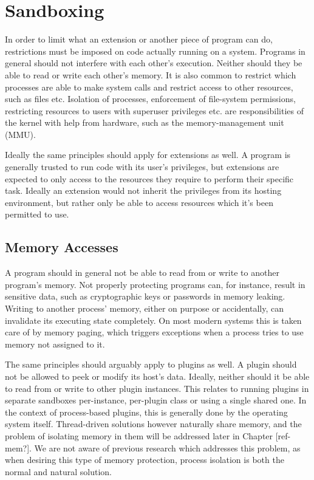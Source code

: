 \chapter {Sandboxing}

In order to limit what an extension or another piece of program can do,
restrictions must be imposed on code actually running on a system. Programs in
general should not interfere with each other's execution. Neither should they be
able to read or write each other's memory. It is also common to restrict which
processes are able to make system calls and restrict access to other resources,
such as files etc. Isolation of processes, enforcement of file-system
permissions, restricting resources to users with superuser privileges etc. are
responsibilities of the kernel with help from hardware, such as the
memory-management unit (MMU).

Ideally the same principles should apply for extensions as well. A program is
generally trusted to run code with its user's privileges, but extensions are
expected to only access to the resources they require to perform their specific
task. Ideally an extension would not inherit the privileges from its hosting
environment, but rather only be able to access resources which it's been
permitted to use.


\section {Memory Accesses}

A program should in general not be able to read from or write to another
program's memory. Not properly protecting programs can, for instance, result in
sensitive data, such as cryptographic keys or passwords in memory leaking.
Writing to another process' memory, either on purpose or accidentally, can
invalidate its executing state completely. On most modern systems this is taken
care of by memory paging, which triggers exceptions when a process tries to use
memory not assigned to it.

The same principles should arguably apply to plugins as well. A plugin should
not be allowed to peek or modify its host's data. Ideally, neither should it be
able to read from or write to other plugin instances. This relates to running
plugins in separate sandboxes per-instance, per-plugin class or using a single
shared one. In the context of process-based plugins, this is generally done by
the operating system itself. Thread-driven solutions however naturally share
memory, and the problem of isolating memory in them will be addressed later in
Chapter [ref-mem?]. We are not aware of previous research which addresses this
problem, as when desiring this type of memory protection, process isolation is
both the normal and natural solution.


